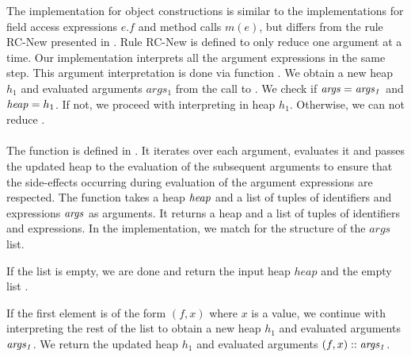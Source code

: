 %
The implementation for object constructions 
is similar to the implementations for field access expressions $e.f$
and method calls $m(e)$,
but differs from the rule RC-New presented in .
Rule RC-New is defined to only reduce one argument at a time.
Our implementation interprets all the argument expressions in the same step.
This argument interpretation is done via function .
We obtain a new heap $h_1$ and evaluated arguments $args_1$
from the call to .
We check if $\mathit{args} = \mathit{args_1}$ and $\mathit{heap} = h_1$.
If not, we proceed with interpreting  in heap $h_1$.
Otherwise, we can not reduce .\\
\\
The function  is defined in .
It iterates over each argument, evaluates it
and passes the updated heap to the evaluation of the subsequent arguments
to ensure that the side-effects occurring during evaluation
of the argument expressions are respected.
The function takes a heap $\mathit{heap}$ and a list of tuples of
identifiers and expressions $\mathit{args}$ as arguments.
It returns a heap and a list of tuples of identifiers and expressions.
In the implementation, we match for the structure of the $args$ list.

If the list is empty, we are done and return the input heap $heap$
and the empty list \nil.

If the first element is of the form $(f, x)$ where $x$ is a value,
we continue with interpreting the rest of the list
to obtain a new heap $h_1$ and evaluated arguments $\mathit{args_1}$.
We return the updated heap $h_1$ and evaluated arguments $(f, x) :: \mathit{args_1}$.

